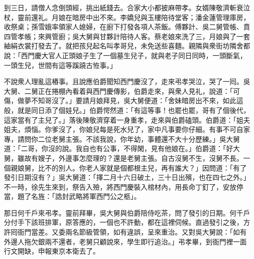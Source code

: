 到三日，請僧人念倒頭經，挑出紙錢去。合家大小都披麻帶孝。女婿陳敬濟斬衰泣杖，靈前還礼。月娘在暗房中出不來。李嬌兒與玉樓陪待堂客；潘金蓮管理庫房，收祭桌；孫雪娥率領家人媳婦，在廚下打發各項人茶飯。傅夥計、吳二舅管帳、賁四管孝帳；來興管廚；吳大舅與甘夥計陪待人客。蔡老娘來洗了三，月娘與了一套紬絹衣裳打發去了。就把孩兒起名叫孝哥兒，未免送些喜麵。親隣與衆街坊隣舍都說：「西門慶大官人正頭娘子生了一個墓生兒子，就與老子同日同時，一頭斷氣，一頭生兒，世間有這等蹊蹺古恠事。」

不說衆人理亂這樁事。且說應伯爵聞知西門慶沒了，走來弔孝哭泣，哭了一囘。吳大舅、二舅正在捲棚內看着與西門慶傳影，伯爵走來，與衆人見礼，說道：「可傷，做夢不知哥沒了。」要請月娘拜見，吳大舅便道：「舍妹暗房出不來，如此這般，就是同日添了個娃兒。」伯爵愕然道：{}「有這等事！也罷也罷，哥有了個後代，這家當有了主兒了。」落後陳敬濟穿着一身重孝，走來與伯爵磕頭。伯爵道：「姐夫姐夫，煩惱。你爹沒了，你娘兒每是死水兒了，家中凡事要你仔細。有事不可自家專，請問你二位老舅主張。不該我說，你年幼，事體還不大十分歷練。」{}吳大舅道：「二哥，你沒的說。我自也有公事，不得閑，見有他娘在。」伯爵道：「好大舅，雖故有嫂子，外邊事怎麼理的？還是老舅主張。自古沒舅不生，沒舅不長。一個親娘舅，比不的別人。你老人家就是個都根主兒，再有誰大？」{}因問道：「有了發引日期沒有？」吳大舅道：「擇二月十六日破土，三十日出殯，也在四七之外。」不一時，徐先生來到，祭告入殮，將西門慶裝入棺材內，用長命丁釘了，安放停當，題了名旌：「誥封武略將軍西門公之柩」。

那日何千戶來弔孝。靈前拜畢，吳大舅與伯爵陪侍吃茶，問了發引的日期。何千戶分付手下該班排軍，原答應的，一個也不許動，都在這裡伺候。直過發引之後，方許囘衙門當差。又委兩名節級管領，如有違誤，呈來重治。又對吳大舅說：「如有外邊人拖欠銀兩不還者，老舅只顧說來，學生即行追治。」{}弔孝畢，到衙門裡一面行文開缺，申報東京本衛去了。

